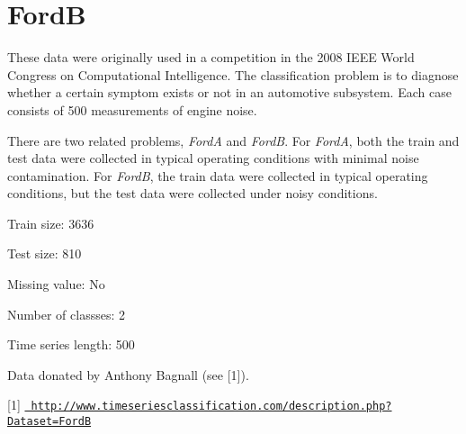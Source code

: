 \chapter{FordB}
\hypertarget{md_external_2data_2UCRArchive__2018_2FordB_2README}{}\label{md_external_2data_2UCRArchive__2018_2FordB_2README}
\label{md_external_2data_2UCRArchive__2018_2FordB_2README_autotoc_md75}%
%
 These data were originally used in a competition in the 2008 IEEE World Congress on Computational Intelligence. The classification problem is to diagnose whether a certain symptom exists or not in an automotive subsystem. Each case consists of 500 measurements of engine noise.

There are two related problems, {\itshape FordA} and {\itshape FordB}. For {\itshape FordA}, both the train and test data were collected in typical operating conditions with minimal noise contamination. For {\itshape FordB}, the train data were collected in typical operating conditions, but the test data were collected under noisy conditions.

Train size\+: 3636

Test size\+: 810

Missing value\+: No

Number of classses\+: 2

Time series length\+: 500

Data donated by Anthony Bagnall (see \mbox{[}1\mbox{]}).

\mbox{[}1\mbox{]} \href{http://www.timeseriesclassification.com/description.php?Dataset=FordB}{\texttt{ http\+://www.\+timeseriesclassification.\+com/description.\+php?\+Dataset=\+FordB}} 